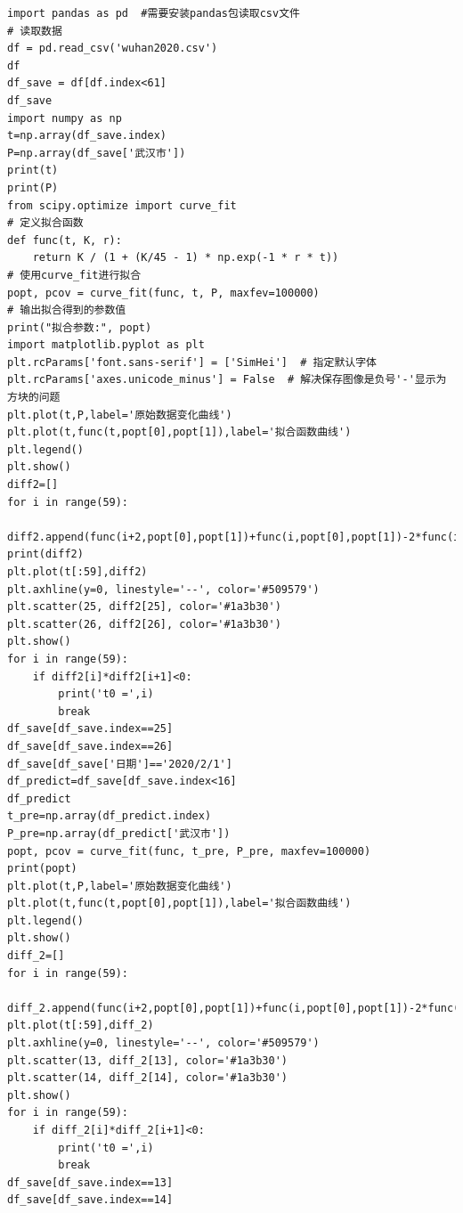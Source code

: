 \documentclass[UTF8,ctexart,a4paper,11pt,openany]{article}
\theoremstyle{definition}
\begin{document}
\begin{lstlisting}[aboveskip=0pt]
import pandas as pd  #需要安装pandas包读取csv文件
# 读取数据
df = pd.read_csv('wuhan2020.csv')
df
df_save = df[df.index<61]
df_save
import numpy as np
t=np.array(df_save.index)
P=np.array(df_save['武汉市'])
print(t)
print(P)
from scipy.optimize import curve_fit
# 定义拟合函数
def func(t, K, r):
    return K / (1 + (K/45 - 1) * np.exp(-1 * r * t))
# 使用curve_fit进行拟合
popt, pcov = curve_fit(func, t, P, maxfev=100000)
# 输出拟合得到的参数值
print("拟合参数:", popt)
import matplotlib.pyplot as plt
plt.rcParams['font.sans-serif'] = ['SimHei']  # 指定默认字体
plt.rcParams['axes.unicode_minus'] = False  # 解决保存图像是负号'-'显示为方块的问题
plt.plot(t,P,label='原始数据变化曲线')
plt.plot(t,func(t,popt[0],popt[1]),label='拟合函数曲线')
plt.legend()
plt.show()
diff2=[]
for i in range(59):
    diff2.append(func(i+2,popt[0],popt[1])+func(i,popt[0],popt[1])-2*func(i+1,popt[0],popt[1]))
print(diff2)
plt.plot(t[:59],diff2)
plt.axhline(y=0, linestyle='--', color='#509579')
plt.scatter(25, diff2[25], color='#1a3b30')
plt.scatter(26, diff2[26], color='#1a3b30')
plt.show()
for i in range(59):
    if diff2[i]*diff2[i+1]<0:
        print('t0 =',i)
        break
df_save[df_save.index==25]
df_save[df_save.index==26]
df_save[df_save['日期']=='2020/2/1']
df_predict=df_save[df_save.index<16]
df_predict
t_pre=np.array(df_predict.index)
P_pre=np.array(df_predict['武汉市'])
popt, pcov = curve_fit(func, t_pre, P_pre, maxfev=100000)
print(popt)
plt.plot(t,P,label='原始数据变化曲线')
plt.plot(t,func(t,popt[0],popt[1]),label='拟合函数曲线')
plt.legend()
plt.show()
diff_2=[]
for i in range(59):
    diff_2.append(func(i+2,popt[0],popt[1])+func(i,popt[0],popt[1])-2*func(i+1,popt[0],popt[1]))
plt.plot(t[:59],diff_2)
plt.axhline(y=0, linestyle='--', color='#509579')
plt.scatter(13, diff_2[13], color='#1a3b30')
plt.scatter(14, diff_2[14], color='#1a3b30')
plt.show()
for i in range(59):
    if diff_2[i]*diff_2[i+1]<0:
        print('t0 =',i)
        break
df_save[df_save.index==13]
df_save[df_save.index==14]
\end{lstlisting}

\clearpage





\end{document}
